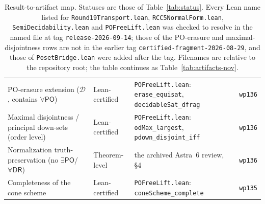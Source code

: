 \documentclass[11pt]{article}
\newcommand{\DR}{\mathsf{DR}}
\newcommand{\PO}{\mathsf{PO}}
\newcommand{\code}[1]{\texttt{#1}}
\theoremstyle{plain}
\theoremstyle{definition}
\begin{document}
\begin{table}[!htbp]
\begin{tabular}{@{}L{0.235\textwidth}L{0.115\textwidth}L{0.40\textwidth}L{0.11\textwidth}@{}}
PO-erasure extension ($\mathcal D$, contains $\forall\PO$) & Lean-certified & \texttt{POFreeLift.lean}: \code{erase\_equisat}, \code{decidableSat\_dfrag} & \texttt{wp136}\\
Maximal disjointness / principal down-sets (order level) & Lean-certified & \texttt{POFreeLift.lean}: \code{odMax\_largest}, \code{pdown\_disjoint\_iff} & \texttt{wp136}\\
Normalization truth-preservation (no $\exists\PO$/$\forall\DR$) & Theorem-level & the archived Astra~6 review, \S4 & \texttt{wp136}\\
Completeness of the cone scheme & Lean-certified & \texttt{POFreeLift.lean}: \code{coneScheme\_complete} & \texttt{wp135}\\
\bottomrule
\end{tabular}
\caption{Result-to-artifact map. Statuses are those of
Table~\ref{tab:status}. Every Lean name listed for
\texttt{Round19Transport.lean}, \texttt{RCC5NormalForm.lean},
\texttt{SemiDecidability.lean} and \texttt{POFreeLift.lean} was checked to
resolve in the named file at tag \texttt{release-2026-09-14}; those of the
PO-erasure and maximal-disjointness rows are not in the earlier tag
\texttt{certified-fragment-2026-08-29}, and those of
\texttt{PosetBridge.lean} were added after the tag. Filenames are
relative to the repository root; the table continues as
Table~\ref{tab:artifacts-nov}.}
\label{tab:artifacts}
\end{table}
\end{document}
